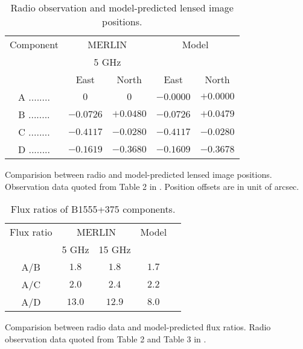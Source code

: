 \documentclass[useAMS,usenatbib]{mn2e}
\begin{document}
\begin{table}
  \caption{Radio observation and model-predicted lensed image positions.}
  \begin{tabular}{@{}ccccc}

\hline

Component	&\multicolumn{2}{c}{MERLIN}		 & \multicolumn{2}{c}{Model} \\
					&\multicolumn{2}{c}{5 GHz}		&			\\
					 &East &North &East 		&North\\ 
\hline
A ........ &$0$    		&$0$		&$-0.0000$ &$+0.0000$   \\  
B ........ &$-0.0726$ 	&$+0.0480$	&$-0.0726$ &$+0.0479$   \\  
C ........ &$-0.4117$  &$-0.0280$	&$-0.4117$ &$-0.0280$   \\  
D ........ &$-0.1619$  &$-0.3680$	&$-0.1609$ &$-0.3678$   \\  
\hline
\end{tabular}

\medskip
Comparision between radio and model-predicted lensed image positions. Observation data quoted from Table 2 in \citet{Marlow}. Position offsets are in unit of arcsec.

\end{table}

\begin{table}
  \caption{Flux ratios of B1555+375 components.}
  \begin{tabular}{@{}ccccc}

\hline
Flux ratio	& \multicolumn{2}{c}{MERLIN} & Model\\
		&5 GHz & 15 GHz  &\\
\hline
A/B			&$1.8$ & $1.8$ & $1.7$  \\ 
A/C 		&$2.0$ 	&$2.4$ &$2.2$  \\
A/D			&$13.0$ &$ 12.9$ & $8.0$  \\

\hline
\end{tabular}

\medskip
Comparision between radio data and model-predicted flux ratios. Radio observation data quoted from Table 2 and Table 3 in \citet{Marlow}.

\end{table}
\end{document}
